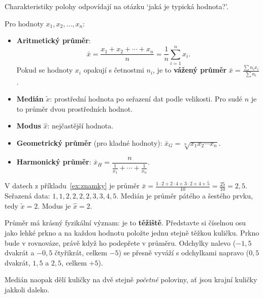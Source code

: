 Charakteristiky polohy odpovídají na otázku `jaká je typická hodnota?'.

\begin{definitionbox}
  Pro hodnoty $x_1, x_2, \ldots, x_n$:
  \begin{itemize}
    \item \textbf{Aritmetický průměr}:
    \begin{equation*}
      \bar{x} = \frac{x_1 + x_2 + \cdots + x_n}{n} = \frac{1}{n}\sum_{i=1}^{n}x_i.
    \end{equation*}
    Pokud se hodnoty $x_i$ opakují s četnostmi $n_i$, je to \textbf{vážený průměr} $\bar{x} = \frac{\sum n_ix_i}{\sum n_i}$.
    \item \textbf{Medián} $\tilde{x}$: prostřední hodnota po seřazení dat podle velikosti. Pro sudé $n$ je to průměr dvou prostředních hodnot.
    \item \textbf{Modus} $\hat{x}$: nejčastější hodnota.
    \item \textbf{Geometrický průměr} (pro kladné hodnoty): $\bar{x}_G = \sqrt[n]{x_1x_2\cdots x_n}$.
    \item \textbf{Harmonický průměr}: $\bar{x}_H = \dfrac{n}{\frac{1}{x_1} + \cdots + \frac{1}{x_n}}$.
  \end{itemize}
\end{definitionbox}

\begin{example}
  V datech z příkladu~\ref{ex:znamky} je průměr $\bar{x} = \frac{1\cdot 2 + 2\cdot 4 + 3\cdot 2 + 4 + 5}{10} = \frac{25}{10} = 2{,}5$. Seřazená data: $1, 1, 2, 2, 2, 2, 3, 3, 4, 5$. Medián je průměr pátého a šestého prvku, tedy $\tilde{x} = 2$. Modus je $\hat{x} = 2$.

  Průměr má krásný fyzikální význam: je to \textbf{těžiště}. Představte si číselnou osu jako lehké prkno a na každou hodnotu položte jednu stejně těžkou kuličku. Prkno bude v rovnováze, právě když ho podepřete v průměru. Odchylky nalevo ($-1{,}5$ dvakrát a $-0{,}5$ čtyřikrát, celkem $-5$) se přesně vyváží s odchylkami napravo ($0{,}5$ dvakrát, $1{,}5$ a $2{,}5$, celkem $+5$).
  \begin{center}
  \end{center}
  Medián naopak dělí kuličky na dvě stejně \textit{početné} poloviny, ať jsou krajní kuličky jakkoli daleko.
\end{example}

